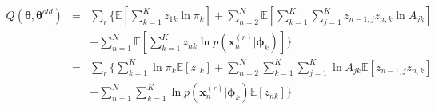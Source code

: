 \begin{eqnarray}
Q(\bm{\theta}, \bm{\theta}^{old})
&=&
\sum_r \{ \mathbb{E} \left[ \sum_{k=1}^K z_{1k} \ln \pi_k \right]
+ \sum_{n=2}^N \mathbb{E} \left[ \sum_{k=1}^K \sum_{j=1}^K z_{n-1,j} z_{n,k} \ln A_{jk} \right]
\nonumber \\
&\;&
+ \sum_{n=1}^N \mathbb{E} \left[ \sum_{k=1}^K z_{nk} \ln p(\textbf{x}_n^{(r)}|\bm{\phi}_k) \right] \}
\nonumber \\
&=&
\sum_r \{ \sum_{k=1}^K \ln \pi_k \mathbb{E} [ z_{1k} ]
+ \sum_{n=2}^N \sum_{k=1}^K \sum_{j=1}^K \ln A_{jk} \mathbb{E}[z_{n-1,j} z_{n,k}]  
\nonumber \\
&\;&
+ \sum_{n=1}^N \sum_{k=1}^K \ln p(\textbf{x}_n^{(r)}|\bm{\phi}_k) \mathbb{E}[z_{nk}] \}
\label{eq: HMM Multiple Q}
\end{eqnarray}





